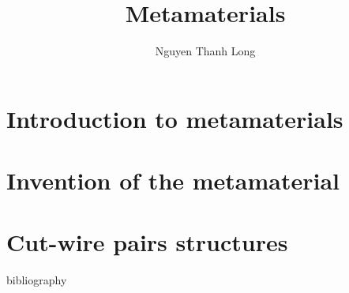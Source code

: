 \documentclass[t]{beamer}
\title{Metamaterials}
\author{Nguyen Thanh Long}
\institute{RF3i - Smart Sensor Lab}
\date{}
\begin{document}
\frame{\titlepage}

\section{Introduction to metamaterials}







\section{Invention of the metamaterial}









\section{Cut-wire pairs structures}





\begin{frame}[allowframebreaks]{bibliography}

\printbibliography

\end{frame}
\end{document}
